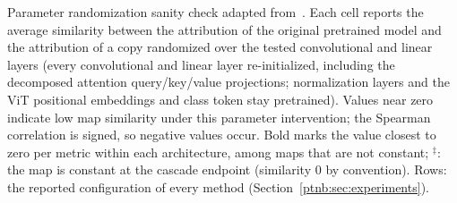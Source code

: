 \begin{table}[tbp]
\centering
\small
\caption[Parameter randomization sanity check]{Parameter randomization sanity check adapted from~\textcite{Adebayo2018sanity}. Each cell reports the average similarity between the attribution of the original pretrained model and the attribution of a copy randomized over the tested convolutional and linear layers (every convolutional and linear layer re-initialized, including the decomposed attention query/key/value projections; normalization layers and the ViT positional embeddings and class token stay pretrained). Values near zero indicate low map similarity under this parameter intervention; the Spearman correlation is signed, so negative values occur. Bold marks the value closest to zero per metric within each architecture, among maps that are not constant; $^{\ddagger}$: the map is constant at the cascade endpoint (similarity $0$ by convention). Rows: the reported configuration of every method (Section~\ref{ptnb:sec:experiments}).}
\label{tab:sanity-check}
%
\end{table}
